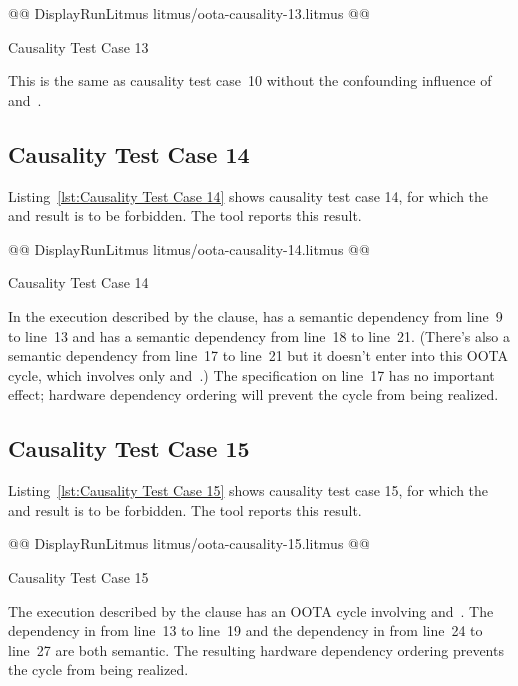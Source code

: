 \documentclass[10]{article}
\begin{document}
\begin{listing}[tbp]
@@ DisplayRunLitmus litmus/oota-causality-13.litmus @@
\caption{Causality Test Case 13}
\label{lst:Causality Test Case 13}
\end{listing}

This is the same as causality test case~10 without the confounding
influence of  and~.

\subsection{Causality Test Case 14}
\label{app:Causality Test Case 14}

Listing~\ref{lst:Causality Test Case 14}
shows causality test case 14, for which the  and 
result is to be forbidden.
The  tool reports this result.

\begin{listing}[tbp]
@@ DisplayRunLitmus litmus/oota-causality-14.litmus @@
\caption{Causality Test Case 14}
\label{lst:Causality Test Case 14}
\end{listing}

In the execution described by the  clause,
 has a semantic dependency from line~9 to
line~13 and  has a semantic dependency from line~18 to
line~21.
(There's also a semantic dependency from line~17 to line~21 but it
doesn't enter into this OOTA cycle, which involves only  and~.)
The  specification on line~17 has no important effect;
hardware dependency ordering will prevent the cycle from being realized.

\subsection{Causality Test Case 15}
\label{app:Causality Test Case 15}

Listing~\ref{lst:Causality Test Case 15}
shows causality test case 15, for which the 
and 
result is to be forbidden.
The  tool reports this result.

\begin{listing}[tbp]
@@ DisplayRunLitmus litmus/oota-causality-15.litmus @@
\caption{Causality Test Case 15}
\label{lst:Causality Test Case 15}
\end{listing}

The execution described by the  clause
has an OOTA cycle involving  and~.
The dependency in  from line~13 to line~19 and the dependency
in  from line~24 to line~27 are both semantic.
The resulting hardware dependency ordering prevents the cycle from
being realized.
\end{document}
